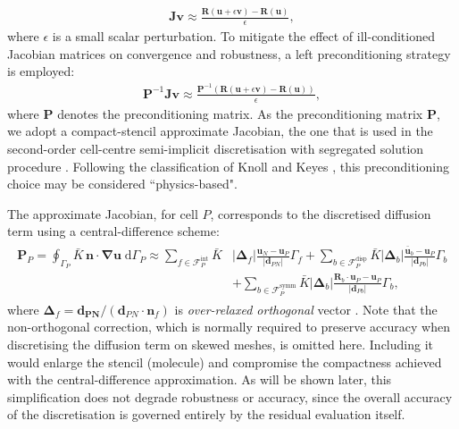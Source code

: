 \documentclass[review,3p]{elsarticle}
\newcommand{\bb}{\boldsymbol}
\begin{document}
%
\begin{eqnarray}
	\bb{J} \bb{v} \approx \frac{\bb{R}(\bb{u}+\epsilon \bb{v})-\bb{R}(\bb{u})}{\epsilon},
\end{eqnarray}
%
where $\epsilon$ is a small scalar perturbation.
To mitigate the effect of ill-conditioned Jacobian matrices on convergence and robustness, a left preconditioning strategy is employed:
%
\begin{eqnarray}\label{eq:jfnk}
	\bb{P}^{-1}\bb{J}  \bb{v}\approx 	\frac{\bb{P}^{-1}(\bb{R}(\bb{u} + \epsilon  \bb{v}) - \bb{R}(\bb{u}))}{\epsilon},
\end{eqnarray}
%
where $\bb{P}$ denotes the preconditioning matrix.
As the preconditioning matrix $\bb{P}$, we adopt a compact-stencil approximate Jacobian, the one that is used in the second-order cell-centre semi-implicit discretisation with segregated solution procedure \cite{Cardiff2018, Tukovic2018}. Following the classification of Knoll and Keyes \cite{Knoll2004}, this preconditioning choice may be considered ``physics-based".

The approximate Jacobian, for cell $P$, corresponds to the discretised diffusion term using a central-difference scheme:
%
\begin{eqnarray}
	\begin{split}
		\bb{P}_P = \oint_{\Gamma_P} \bar{K} \, \bb{n} \cdot \bb{\nabla} \bb{u} \; \text{d}\Gamma_P \approx
		\sum_{f \in \mathcal{F}^{\text{int}}_P}  \bar{K} &
		\left|\bb{\Delta}_{f} \right| \frac{ \bb{u}_{N} - \bb{u}_P}{\left|\bb{d}_{PN}\right|}    \Gamma_{f}
		+  \sum_{b \in \mathcal{F}^{\text{disp}}_P}  \bar{K}
		\left|\bb{\Delta}_{b} \right| \frac{ \bar{\bb{u}}_{b}  - \bb{u}_P}{\left|\bb{d}_{Pb}\right|}
		{\Gamma}_{b}    \\
		&	+ \sum_{b \in \mathcal{F}^{\text{symm}}_P}  \bar{K}
		\left|\bb{\Delta}_{b} \right| \frac{ \bb{R}_{b} \cdot \bb{u}_{P} - \bb{u}_P}{\left|\bb{d}_{Pb}\right|} {\Gamma}_{b},
	\end{split}
\end{eqnarray}
%
where $\bb{\Delta}_{f}=\bb{d_{PN}}/(\bb{d}_{PN} \cdot \bb{n}_f)$ is \emph{over-relaxed orthogonal} vector \cite{Demirdzic2015}.
Note that the non-orthogonal correction, which is normally required to preserve accuracy when discretising the diffusion term on skewed meshes, is omitted here.
Including it would enlarge the stencil (molecule) and compromise the compactness achieved with the central-difference approximation.
As will be shown later, this simplification does not degrade robustness or accuracy, since the overall accuracy of the discretisation is governed entirely by the residual evaluation itself.
\end{document}
